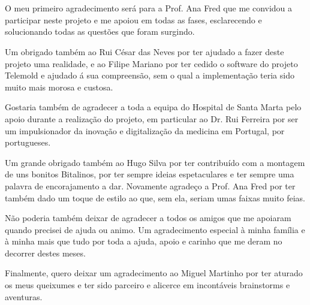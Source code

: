 
\section*{\acknowledgments}



O meu primeiro agradecimento será para a Prof. Ana Fred que me convidou a participar neste projeto e me apoiou em todas as fases, esclarecendo e solucionando todas as questões que foram surgindo.

Um obrigado também ao Rui César das Neves por ter ajudado a fazer deste projeto uma realidade, e ao Filipe Mariano por ter cedido o software do projeto Telemold e ajudado á sua compreensão, sem o qual a implementação teria sido muito mais morosa e custosa.

Gostaria também de agradecer a toda a equipa do Hospital de Santa Marta pelo apoio durante a realização do projeto, em particular ao Dr. Rui Ferreira por ser um impulsionador da inovação e digitalização da medicina em Portugal, por portugueses.

Um grande obrigado também ao Hugo Silva por ter contribuído com a montagem de uns bonitos Bitalinos, por ter sempre ideias espetaculares e ter sempre uma palavra de encorajamento a dar. Novamente agradeço a Prof. Ana Fred por ter também dado um toque de estilo ao que, sem ela, seriam umas faixas muito feias.

Não poderia também deixar de agradecer a todos os amigos que me apoiaram quando precisei de ajuda ou animo. Um agradecimento especial à minha família e à minha mais que tudo por toda a ajuda, apoio e carinho que me deram no decorrer destes meses.

Finalmente, quero deixar um agradecimento ao Miguel Martinho por ter aturado os meus queixumes e ter sido parceiro e alicerce em incontáveis brainstorms e aventuras. 


